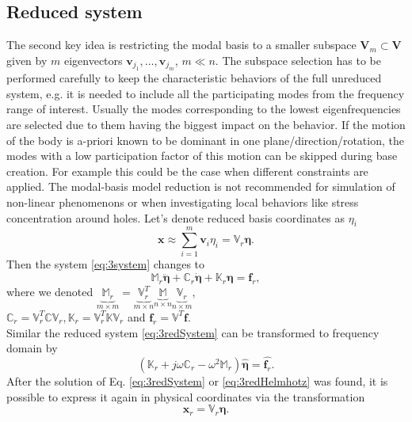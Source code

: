 \documentclass[conference]{journal}%
\newcommand{\bb}[1]{\mathbb{#1}}
\newcommand{\B}[1]{\mathbf{#1}}
\newcommand{\Bx}{\B{x}}
\newcommand{\Bv}{\B{v}}
\newcommand{\Beta}{\boldsymbol{\eta}}
\newcommand{\M}{\bb{M}}
\newcommand{\C}{\bb{C}}
\newcommand{\K}{\bb{K}}
\begin{document}
	\subsection{Reduced system}
	The second key idea is restricting the modal basis to a smaller subspace $\B{V}_m \subset \B{V}$ given by $m$ eigenvectors $\Bv_{j_1}, \ldots, \Bv_{j_m}$,  $m \ll n$. The subspace selection has to be performed carefully to keep the characteristic behaviors of the full unreduced system, e.g. it is needed to include all the participating modes from the frequency range of interest. Usually the modes corresponding to the lowest eigenfrequencies are selected due to them having the biggest impact on the behavior. If the motion of the body is a-priori known to be dominant in one plane/direction/rotation, the modes with a low participation factor of this motion can be skipped during base creation. For example this could be the case when different constraints are applied. The modal-basis model reduction is not recommended for simulation of non-linear phenomenons or when investigating local behaviors like stress concentration around holes.
	Let's denote reduced basis coordinates as $\eta_i$
	\begin{equation} \label{eq:3redBasis}
	\Bx \approx \sum\limits_{i=1}^{m} \Bv_i \eta_i = \bb{V}_r \Beta.
	\end{equation}
	Then the system \eqref{eq:3system} changes to
	\begin{equation} \label{eq:3redSystem}
	\M_r \ddot{\Beta} + \C_r \dot{\Beta} + \K_r \Beta = \B{f}_r,
	\end{equation}
	where we denoted $\underbrace{{\M}_r}_{m \times m} = \underbrace{\bb{V}_r^T}_{m \times n} \underbrace{\M}_{n \times n} \underbrace{\bb{V}_r}_{n \times m}$,\\
	$\C_r = \bb{V}^T_r \C \bb{V}_r, \K_r = \bb{V}^T_r \K \bb{V}_r$ and $\B{f}_r = \bb{V}^T \B{f}$. %
	\\Similar the reduced system \eqref{eq:3redSystem} can be transformed to frequency domain by
	\begin{equation} \label{eq:3redHelmhotz}
	(\K_r + j \omega \C_r - \omega^2 \M_r ) \hat{\Beta} = \hat{\B{f}_r}.
	\end{equation}
	After the solution of Eq. \eqref{eq:3redSystem} or \eqref{eq:3redHelmhotz} was found, it is possible to express it again in physical coordinates via the transformation
	\begin{equation} \label{eq:3transfBack}
	\Bx_r = \bb{V}_r \Beta.
	\end{equation}
	
\end{document}

